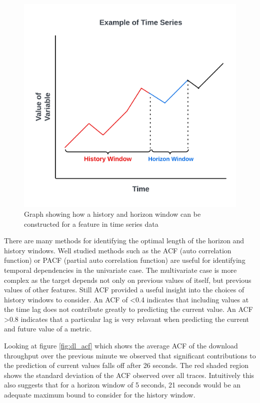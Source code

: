 \begin{figure}[h]
\includegraphics[scale=0.15]{History Horizon.png}
\centering
\caption{Graph showing how a history and horizon window can be constructed for a feature in time series data}
\label{fig:example_of_ts}
\end{figure}

There are many methods for identifying the optimal length of the horizon and history windows. Well studied methods such as the ACF (auto correlation function) or PACF (partial auto correlation function) \cite{10.2307/2958346} are useful for identifying temporal dependencies in the univariate case. The multivariate case is more complex as the target depends not only on previous values of itself, but previous values of other features. Still ACF provided a useful insight into the choices of history windows to consider. An ACF of <0.4 indicates that including values at the time lag does not contribute greatly to predicting the current value. An ACF >0.8 indicates that a particular lag is very relavant when predicting the current and future value of a metric.

Looking at figure \ref{fig:dl_acf} which shows the average ACF of the download throughput over the previous minute we observed that significant contributions to the prediction of current values falls off after 26 seconds. The red shaded region shows the standard deviation of the ACF observed over all traces. Intuitively this also suggests that for a horizon window of 5 seconds, 21 seconds would be an adequate maximum bound to consider for the history window.

